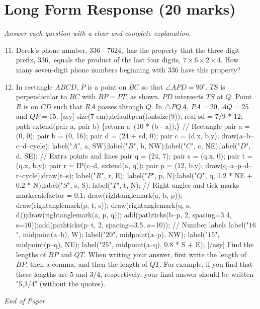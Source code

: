 \documentclass[12pt]{article}
\begin{document}
\section*{Long Form Response (20 marks)}
\textit{Answer each question with a clear and complete explanation.}
\begin{enumerate}[label=\arabic*.]
\setcounter{enumi}{10}
\item Derek's phone number, $336$ - $7624,$ has the property that the three-digit prefix, $336,$ equals the product of the last four digits, $7 \times 6 \times 2 \times 4.$ How many seven-digit phone numbers beginning with $336$ have this property?
\item In rectangle $ABCD$, $P$ is a point on $BC$ so that $\angle APD=90^{\circ}$. $TS$ is perpendicular to $BC$ with $BP=PT$, as shown. $PD$ intersects $TS$ at $Q$. Point $R$ is on $CD$ such that $RA$ passes through $Q$. In $\triangle PQA$, $PA=20$, $AQ=25$ and $QP=15$. [asy] size(7 cm);defaultpen(fontsize(9)); real sd = 7/9 * 12; path extend(pair a, pair b) \{return a--(10 * (b - a));\} // Rectangle pair a = (0, 0); pair b = (0, 16); pair d = (24 + sd, 0); pair c = (d.x, b.y); draw(a--b--c--d--cycle); label("$A$", a, SW);label("$B$", b, NW);label("$C$", c, NE);label("$D$", d, SE); // Extra points and lines pair q = (24, 7); pair s = (q.x, 0); pair t = (q.x, b.y); pair r = IP(c--d, extend(a, q)); pair p = (12, b.y); draw(q--a--p--d--r--cycle);draw(t--s); label("$R$", r, E); label("$P$", p, N);label("$Q$", q, 1.2 * NE + 0.2 * N);label("$S$", s, S); label("$T$", t, N); // Right angles and tick marks markscalefactor = 0.1; draw(rightanglemark(a, b, p)); draw(rightanglemark(p, t, s)); draw(rightanglemark(q, s, d));draw(rightanglemark(a, p, q)); add(pathticks(b--p, 2, spacing=3.4, s=10));add(pathticks(p--t, 2, spacing=3.5, s=10)); // Number labels label("$16$", midpoint(a--b), W); label("$20$", midpoint(a--p), NW); label("$15$", midpoint(p--q), NE); label("$25$", midpoint(a--q), 0.8 * S + E); [/asy] Find the lengths of $BP$ and $QT$. When writing your answer, first write the length of $BP$, then a comma, and then the length of $QT$. For example, if you find that these lengths are $5$ and $3/4$, respectively, your final answer should be written "5,3/4" (without the quotes).
\end{enumerate}

\vfill
\noindent\textit{End of Paper}
\end{document}
